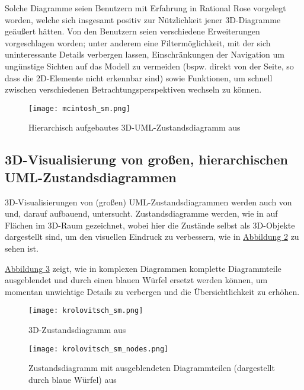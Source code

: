 \documentclass[a4paper,10pt]{sphinxmanual}
\begin{document}
Solche Diagramme seien Benutzern mit Erfahrung in Rational Rose vorgelegt worden, welche sich insgesamt positiv zur Nützlichkeit jener 3D-Diagramme geäußert hätten.
Von den Benutzern seien verschiedene Erweiterungen vorgeschlagen worden; unter anderem eine Filtermöglichkeit, mit der sich uninteressante Details verbergen lassen, Einschränkungen der Navigation um ungünstige Sichten auf das Modell zu vermeiden (bspw. direkt von der Seite, so dass die 2D-Elemente nicht erkennbar sind) sowie Funktionen, um schnell zwischen verschiedenen Betrachtungsperspektiven wechseln zu können.
\begin{figure}[htbp]
\centering
\capstart

\texttt{[image: mcintosh\_sm.png]}
\caption{Hierarchisch aufgebautes 3D-UML-Zustandsdiagramm aus \cite{mcintosh_x3d-uml:_2008}}\label{related:mcintosh-sm}\end{figure}
\pagebreak

\subsection{3D-Visualisierung von großen, hierarchischen UML-Zustandsdiagrammen}
\label{related:d-visualisierung-von-groszen-hierarchischen-uml-zustandsdiagrammen}\label{related:krolovitsch}
3D-Visualisierungen von (großen) UML-Zustandsdiagrammen werden auch von \cite{krolovitsch_3d_2009} und, darauf aufbauend, \cite{alvergren_3d_2009} untersucht.
Zustandsdiagramme werden, wie in \cite{mcintosh_x3d-uml:_2008} auf Flächen im 3D-Raum gezeichnet, wobei hier die Zustände selbst als 3D-Objekte dargestellt sind, um den visuellen Eindruck zu verbessern, wie in \hyperref[related:krolovitsch-sm]{Abbildung  \ref*{related:krolovitsch-sm}} zu sehen ist.

\hyperref[related:krolovitsch-sm-nodes]{Abbildung  \ref*{related:krolovitsch-sm-nodes}} zeigt, wie in komplexen Diagrammen komplette Diagrammteile ausgeblendet und durch einen blauen Würfel ersetzt werden können, um momentan unwichtige Details zu verbergen und die Übersichtlichkeit zu erhöhen.
\begin{figure}[htbp]
\centering
\capstart

\texttt{[image: krolovitsch\_sm.png]}
\caption{3D-Zustandsdiagramm aus \cite{krolovitsch_3d_2009}}\label{related:krolovitsch-sm}\end{figure}
\begin{figure}[htbp]
\centering
\capstart

\texttt{[image: krolovitsch\_sm\_nodes.png]}
\caption{Zustandsdiagramm mit ausgeblendeten Diagrammteilen (dargestellt durch blaue Würfel) aus \cite{krolovitsch_3d_2009}}\label{related:krolovitsch-sm-nodes}\end{figure}
\end{document}
